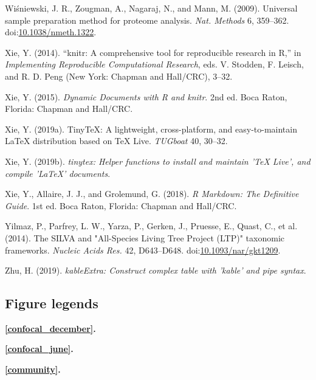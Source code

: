 \documentclass[12pt,]{article}
\begin{document}
\leavevmode\hypertarget{ref-Wisniewski2009}{}%
Wiśniewski, J. R., Zougman, A., Nagaraj, N., and Mann, M. (2009).
Universal sample preparation method for proteome analysis. \emph{Nat.
Methods} 6, 359--362.
doi:\href{https://doi.org/10.1038/nmeth.1322}{10.1038/nmeth.1322}.

\leavevmode\hypertarget{ref-Xie2014}{}%
Xie, Y. (2014). ``knitr: A comprehensive tool for reproducible research
in R,'' in \emph{Implementing Reproducible Computational Research}, eds.
V. Stodden, F. Leisch, and R. D. Peng (New York: Chapman and Hall/CRC),
3--32.

\leavevmode\hypertarget{ref-Xie2015}{}%
Xie, Y. (2015). \emph{Dynamic Documents with R and knitr}. 2nd ed. Boca
Raton, Florida: Chapman and Hall/CRC.

\leavevmode\hypertarget{ref-Xie2019a}{}%
Xie, Y. (2019a). TinyTeX: A lightweight, cross-platform, and
easy-to-maintain LaTeX distribution based on TeX Live. \emph{TUGboat}
40, 30--32.

\leavevmode\hypertarget{ref-Xie2019b}{}%
Xie, Y. (2019b). \emph{tinytex: Helper functions to install and maintain
'TeX Live', and compile 'LaTeX' documents}.

\leavevmode\hypertarget{ref-Xie2018}{}%
Xie, Y., Allaire, J. J., and Grolemund, G. (2018). \emph{R Markdown: The
Definitive Guide}. 1st ed. Boca Raton, Florida: Chapman and Hall/CRC.

\leavevmode\hypertarget{ref-Yilmaz2014}{}%
Yilmaz, P., Parfrey, L. W., Yarza, P., Gerken, J., Pruesse, E., Quast,
C., et al. (2014). The SILVA and "All-Species Living Tree Project (LTP)"
taxonomic frameworks. \emph{Nucleic Acids Res.} 42, D643--D648.
doi:\href{https://doi.org/10.1093/nar/gkt1209}{10.1093/nar/gkt1209}.

\leavevmode\hypertarget{ref-Zhu2019}{}%
Zhu, H. (2019). \emph{kableExtra: Construct complex table with 'kable'
and pipe syntax}.

\newpage 
\setlength\parindent{0pt}

\hypertarget{figure-legends}{%
\subsection{Figure legends}\label{figure-legends}}

\textbf{\autoref{confocal_december}.} 

\textbf{\autoref{confocal_june}.} 

\textbf{\autoref{community}.} 
\end{document}
